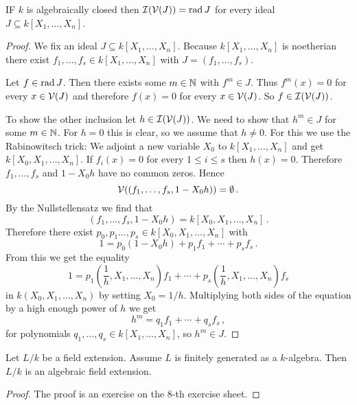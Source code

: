 \begin{corollary}
  IF $k$ is algebraically closed then $\mathcal{I}(\mathcal{V}(J)) = \operatorname{rad} J$ for every ideal $J \subseteq k[X_1, \dotsc, X_n]$.
\end{corollary}
\begin{proof}
  We fix an ideal $J \subseteq k[X_1, \dotsc, X_n]$.
  Because $k[X_1, \dotsc, X_n]$ is noetherian there exist $f_1, \dotsc, f_s \in k[X_1, \dotsc, X_n]$ with $J = (f_1, \dotsc, f_s)$.
  
  Let $f \in \operatorname{rad} J$.
  Then there exists some $m \in \mathbb{N}$ with $f^m \in J$.
  Thus $f^m(x) = 0$ for every $x \in \mathcal{V}(J)$ and therefore $f(x) = 0$ for every $x \in \mathcal{V}(J)$.
  So $f \in \mathcal{I}(\mathcal{V}(J))$.
  
  To show the other inclusion let $h \in \mathcal{I}(\mathcal{V}(J))$.
  We need to show that $h^m \in J$ for some $m \in \mathbb{N}$.
  For $h = 0$ this is clear, so we assume that $h \neq 0$.
  For this we use the Rabinowitsch trick:
  We adjoint a new variable $X_0$ to $k[X_1, \dotsc, X_n]$ and get $k[X_0, X_1, \dotsc, X_n]$.
  If $f_i(x) = 0$ for every $1 \leq i \leq s$ then $h(x) = 0$.
  Therefore $f_1, \dotsc, f_s$ and $1 - X_0 h$ have no common zeros.
  Hence
  \[
      \mathcal{V}((f_1, \dotsc, f_s, 1 - X_0 h))
    = \emptyset \,.
  \]
  By the Nullstellensatz we find that
  \[
      ( f_1, \dotsc, f_s, 1 - X_0 h )
    = k[X_0, X_1, \dotsc, X_n] \,.
  \]
  Therefore there exist $p_0, p_1 \ldots, p_s \in k[X_0, X_1, \dotsc, X_n]$ with
  \[
      1
    = p_0 (1 - X_0 h) + p_1 f_1 + \dotsb + p_s f_s \,.
  \]
  From this we get the equality
  \[
      1
    =   p_1 \left(\frac{1}{h}, X_1, \dotsc, X_n\right) f_1
      + \dotsb
      + p_s \left(\frac{1}{h}, X_1, \dotsc, X_n\right) f_s
  \]
  in $k(X_0, X_1, \dotsc, X_n)$ by setting $X_0 = 1 / h$.
  Multiplying both sides of the equation by a high enough power of $h$ we get
  \[
      h^m
    = q_1 f_1 + \dotsb + q_s f_s \,,
  \]
  for polynomials $q_1, \dotsc, q_s \in k[X_1, \dotsc, X_n]$, so $h^m \in J$.
\end{proof}


\begin{lemma}\label{lemma: finitely generated field extensions are algebraic}
  Let $L/k$ be a field extension.
  Assume $L$ is finitely generated as a $k$-algebra.
  Then $L/k$ is an algebraic field extension.
\end{lemma}
\begin{proof}
  The proof is an exercise on the $8$-th exercise sheet.
\end{proof}


